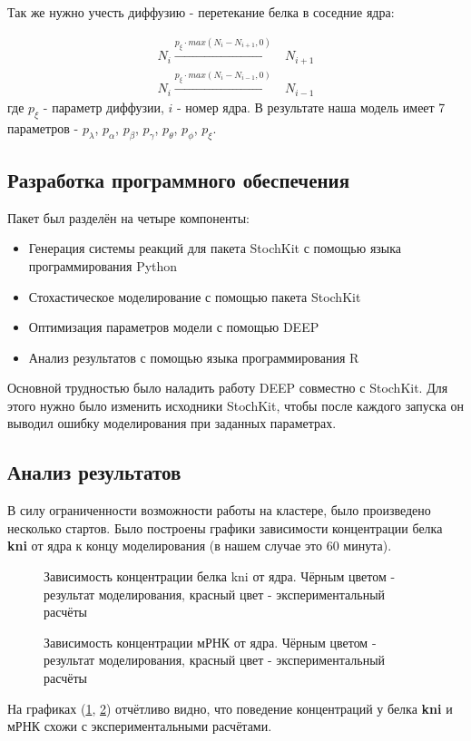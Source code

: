 Так же нужно учесть диффузию - перетекание белка в соседние ядра:

\begin{align*}
N_i   \xrightarrow{p_{\xi} \cdot max(N_i - N_{i+1}, 0)} & N_{i+1} \\
N_i   \xrightarrow{p_{\xi} \cdot max(N_i - N_{i-1}, 0)} & N_{i-1}
\end{align*}
где $p_{\xi}$ - параметр диффузии, $i$ - номер ядра.
В результате наша модель имеет 7 параметров - $p_{\lambda}$, $p_{\alpha}$, $p_{\beta}$, $p_{\gamma}$, $p_{\theta}$, $p_{\phi}$, $p_{\xi}$.


\subsection{Разработка программного обеспечения}
Пакет был разделён на четыре компоненты:
\begin{itemize}
  \item Генерация системы реакций для пакета StochKit с помощью языка программирования Python
  \item Стохастическое моделирование с помощью пакета StochKit
  \item Оптимизация параметров модели с помощью DEEP
  \item Анализ результатов с помощью языка программирования R
\end{itemize}

Основной трудностью было наладить работу DEEP совместно с StochKit. Для этого нужно было изменить исходники StoсhKit, чтобы после каждого запуска он выводил ошибку моделирования при заданных параметрах.

\subsection{Анализ результатов}
В силу ограниченности возможности работы на кластере, было произведено несколько стартов. Было построены графики зависимости
концентрации белка \textbf{kni} от ядра к концу моделирования (в нашем случае это 60 минута).
\begin{figure}[h]
  \caption{Зависимость концентрации белка kni от ядра. Чёрным цветом - результат моделирования, красный цвет - экспериментальный расчёты}
  \label{fig:kni}
\end{figure}

\begin{figure}[h]
  \caption{Зависимость концентрации мРНК от ядра. Чёрным цветом - результат моделирования, красный цвет - экспериментальный расчёты}
  \label{fig:rna}
\end{figure}

На графиках (\ref{fig:kni}, \ref{fig:rna}) отчётливо видно, что поведение концентраций у белка \textbf{kni} и мРНК схожи с экспериментальными расчётами.
